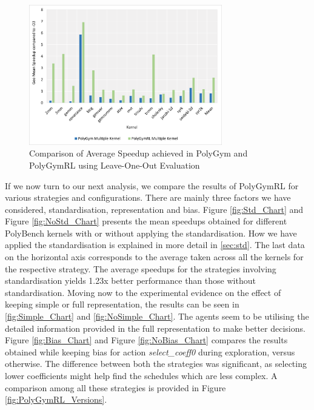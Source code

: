 \documentclass[logo,msc]{infthesis}           %
\begin{document}
\begin{figure}[htbp]
  \centering
  \includegraphics[width=0.75\textwidth]{Images/Chart_Multiple_PolyGym_PolyGymRL.png}    
  \caption{Comparison of Average Speedup achieved in PolyGym and PolyGymRL using Leave-One-Out Evaluation}
  \label{fig:multi_PolyGym_PolyGymRL}
\end{figure}

If we now turn to our next analysis, we compare the results of PolyGymRL for various strategies and configurations. There are mainly three factors we have considered, standardisation, representation and bias. Figure \ref{fig:Std_Chart} and Figure \ref{fig:NoStd_Chart} presents the mean speedups obtained for different PolyBench kernels with or without applying the standardisation. How we have applied the standardisation is explained in more detail in \ref{sec:std}. The last data on the horizontal axis corresponds to the average taken across all the kernels for the respective strategy. The average speedups for the strategies involving standardisation yields 1.23x better performance than those without standardisation. Moving now to the experimental evidence on the effect of keeping simple or full representation, the results can be seen in \ref{fig:Simple_Chart} and \ref{fig:NoSimple_Chart}. The agents seem to be utilising the detailed information provided in the full representation to make better decisions. Figure \ref{fig:Bias_Chart} and Figure \ref{fig:NoBias_Chart} compares the results obtained while keeping bias for action \textit{select\_coeff0} during exploration, versus otherwise. The difference between both the strategies was significant, as selecting lower coefficients might help find the schedules which are less complex. A comparison among all these strategies is provided in Figure \ref{fig:PolyGymRL_Versions}.
\end{document}
